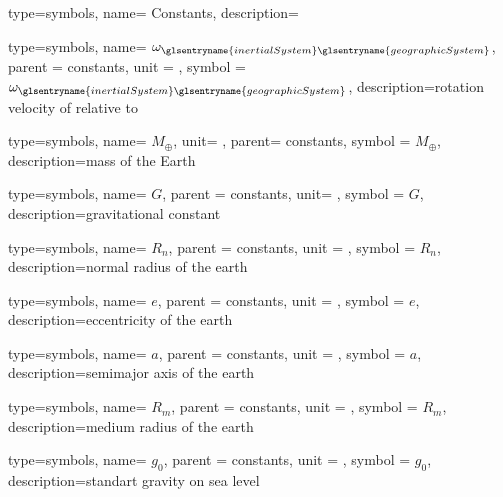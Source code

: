 {type=symbols,
    name= {Constants},
    description={}
}

{type=symbols,
    name= \ensuremath{\omega_{\glsentryname{inertialSystem}\glsentryname{geographicSystem}}},
    parent = {constants},
    unit = \unexpanded{\si{\radian\per\second}},
    symbol = \ensuremath{\omega_{\glsentryname{inertialSystem}\glsentryname{geographicSystem}}},
    description={rotation velocity of  relative to 
        }
}

{type=symbols,
    name= \ensuremath{M_\oplus},
    unit= ,
    parent= {constants},
    symbol = \ensuremath{M_\oplus},
    description={mass of the Earth}
}

{type=symbols,
    name= \ensuremath{G},
    parent = {constants},
    unit= \enexpand{\si{\meter\cubic\per\kilogram\per\second\squared}},
    symbol = \ensuremath{G},
    description={gravitational constant}
}


{type=symbols,
    name= \ensuremath{R_{n}},
    parent = {constants},
    unit = \unexpanded{\si{\meter}},
    symbol = \ensuremath{R_{n}},
    description={normal radius of the earth}
}



{type=symbols,
    name= \ensuremath{e},
    parent = {constants},
    unit = \unexpanded{},
    symbol = \ensuremath{e},
    description={eccentricity of the earth}
}

{type=symbols,
    name= \ensuremath{a},
    parent = {constants},
    unit = \unexpanded{\si{\meter}},
    symbol = \ensuremath{a},
    description={semimajor axis of the earth}
}

{type=symbols,
    name= \ensuremath{R_m},
    parent = {constants},
    unit = \unexpanded{\si{\meter}},
    symbol = \ensuremath{R_m},
    description={medium radius of the earth}
}

{type=symbols,
  name= \ensuremath{g_0},
  parent = {constants},
  unit = \unexpanded{\si{\meter\per\second\squared}},
  symbol = \ensuremath{g_0},
  description={standart gravity on sea level}
}
